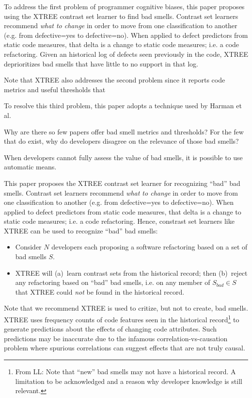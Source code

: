\documentclass{sig-alternate}
\begin{document}
To address the first problem of programmer cognitive biases,
this paper proposes using the   XTREE contrast set learner to
find bad smells. Contrast set learners   recommend {\em what to change} in order to move from
     one classification to another (e.g. from defective=yes to
     defective=no).
     When applied to defect predictors from static code measures,
that delta is a change to static code measures;
i.e. a code refactoring. Given an historical log of defects seen previously in the code, XTREE deprioritizes bad smells that have little to no support in that log.



Note that XTREE also addresses the second problem since it reports
code metrics and useful thresholds that


To resolve this third problem, this paper adopts
a technique used by Harman et al.

Why are there so few papers offer bad smell metrics and thresholds? For the few that
do exist, why do developers disagree on the relevance of those bad smells?


When developers cannot fully assess the value of bad smells,
it is possible to use automatic means. 

This paper proposes the XTREE contrast set learner for recognizing
``bad'' bad smells. 
Contrast set learners   recommend {\em what to change} in order to move from
     one classification to another (e.g. from defective=yes to
     defective=no).
     When applied to defect predictors from static code measures,
that delta is a change to static code measures;
i.e. a code refactoring. Hence, constrast set learners
like XTREE can be used to  recognize ``bad''
bad smells:
\begin{itemize}
    \item Consider $N$ developers each proposing a software refactoring 
based on a set of bad smells $S$.
\item XTREE will (a)~learn contrast sets
from the historical record; then (b)~reject  any refactoring based on ``bad'' bad smells, i.e.
 on any member of $S_{\mathit{bad}} \in S$
that XTREE could {\em not} be found in the historical record.
\end{itemize}
Note that we    recommend  XTREE  is used to critize, but  not to create,
bad smells. 
XTREE uses frequency counts of code features seen in the historical record\footnote{From LL: Note that ``new'' bad smells may not have a historical record. A limitation to be acknowledged and a reason why developer knowledge is still relevant.}
to generate
predictions about the effects of changing code
attributes. Such predictions may be inaccurate due to the infamous correlation-vs-causation problem
where spurious correlations can suggest effects that are not
truly causal.
\end{document}
